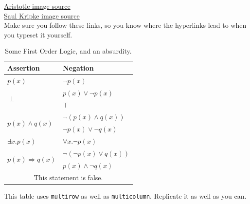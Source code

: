 \documentclass{article}
\theoremstyle{remark}
\begin{document}
\begin{figure}[H]
\begin{floatrow}
    \end{floatrow}
\end{figure}
\href{https://www.britannica.com/biography/Aristotle#/media/1/34560/76426}{Aristotle image source}\\
\href{https://commons.wikimedia.org/w/index.php?curid=5763037}{Saul Kripke image source}\\
Make sure you follow these links, so you know where the hyperlinks lead to when you typeset it yourself.
\begin{table}[H]
    \centering
    \begin{tabular}{p{10em}|p{10em}} 
        \hline
         \textbf{Assertion} & \textbf{Negation}\\
         \hline 
         $p(x)$ & $\neg p(x)$  \\
         \hline
         \multirow{2}{*}{$\perp$} & $p(x) \vee \neg p(x)$\\ %
         & $\top$\\
         \hline
         \multirow{2}{*}{$p(x)\wedge q(x)$} & $\neg\left(p(x)\wedge q(x)\right)$ \\
         & $\neg p(x)\vee\neg q(x)$\\
         \hline
         $\exists x.p(x)$ & $\forall x.\neg p(x)$\\
         \hline
         \multirow{2}{*}{$p(x)\Rightarrow q(x)$} & $\neg\left(\neg p(x)\vee q(x)\right)$\\
         & $p(x)\wedge \neg q(x)$\\
         \hline
         \multicolumn{2}{c}{This statement is false.}\\
         \hline
    \end{tabular}
    \caption{Some First Order Logic, and an absurdity.}
    \label{tab:logic}
\end{table}
This table uses \verb!multirow! as well as \verb!multicolumn!.
Replicate it as well as you can.
\end{document}
